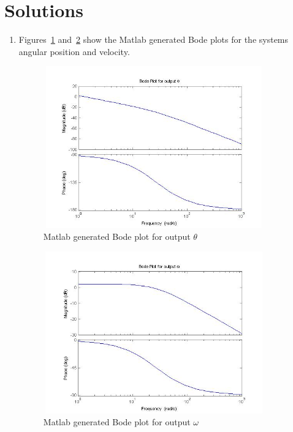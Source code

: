\documentclass[letterpaper, 11pt, openany]{book}
\begin{document}
\section{Solutions}
\begin{enumerate}
\item Figures~\ref{fig:BodeTheta} and~\ref{fig:BodeOmega} show the Matlab generated 
Bode plots for the systems angular position and velocity. 
\begin{figure}[htbp]
\centering
\includegraphics[width=0.9\textwidth, height = 7cm]{graphics/BodeTheta.jpg} 
\caption{Matlab generated Bode plot for output $\theta$}\label{fig:BodeTheta}
\end{figure}

\begin{figure}[htbp]
\centering
\includegraphics[width=0.9\textwidth, height = 7cm]{graphics/BodeOmega.jpg} 
\caption{Matlab generated Bode plot for output $\omega$}\label{fig:BodeOmega}
\end{figure}


\end{enumerate}
\end{document}
